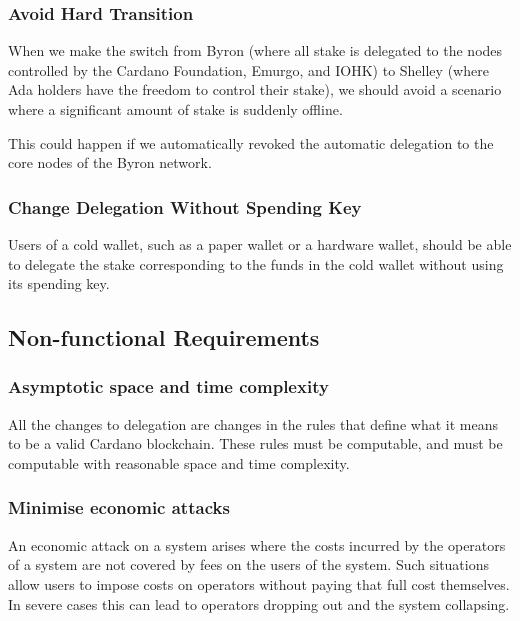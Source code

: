 \documentclass[11pt,a4paper]{article}
\begin{document}
\subsubsection{Avoid Hard Transition}
\label{avoid-hard-transition}

When we make the switch from Byron (where all stake is delegated to the
nodes controlled by the Cardano Foundation, Emurgo, and IOHK) to Shelley
(where Ada holders have the freedom to control their stake), we should
avoid a scenario where a significant amount of stake is suddenly
offline.

This could happen if we automatically revoked the automatic delegation
to the core nodes of the Byron network.

\subsubsection{Change Delegation Without Spending Key}
\label{change-delegation-without-spending-key}

Users of a cold wallet, such as a paper wallet or a hardware wallet,
should be able to delegate the stake corresponding to the funds in the
cold wallet without using its spending key.

\subsection{Non-functional Requirements}
\label{non-functional-requirements}

\subsubsection{Asymptotic space and time complexity}
\label{asymptotic-space-and-time-complexity}

All the changes to delegation are changes in the rules that define what
it means to be a valid Cardano blockchain. These rules must be
computable, and must be computable with reasonable space and time
complexity.

\subsubsection{Minimise economic attacks}
\label{minimise-economic-attacks}

An economic attack on a system arises where the costs incurred by the
operators of a system are not covered by fees on the users of the
system. Such situations allow users to impose costs on operators without
paying that full cost themselves. In severe cases this can lead to
operators dropping out and the system collapsing.
\end{document}
